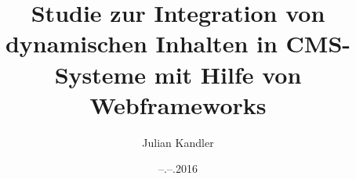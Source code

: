 \title{Studie zur Integration von dynamischen Inhalten in CMS-Systeme mit Hilfe von Webframeworks}
\author{Julian Kandler}
\date{--.--.2016}
\subject{Masterarbeit}